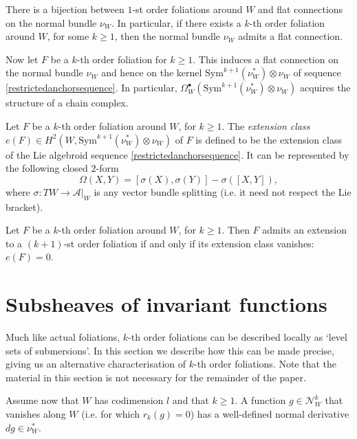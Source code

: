 \documentclass[10pt]{amsart}
\numberwithin{theoremalpha}{section}
\numberwithin{equation}{section}
\numberwithin{definition}{section}
\numberwithin{theorem}{section}
\numberwithin{proposition}{section}
\numberwithin{lemma}{section}
\numberwithin{example}{section}
\numberwithin{remark}{section}
\numberwithin{corollary}{section}
\numberwithin{question}{section}
\numberwithin{problem}{section}
\numberwithin{assumption}{section}
\theoremstyle{named}
\numberwithin{equation}{section}
\begin{document}
\begin{corollary} \label{existenceofflatconnection}
There is a bijection between $1$-st order foliations around $W$ and flat connections on the normal bundle $\nu_{W}$. In particular, if there exists a $k$-th order foliation around $W$, for some $k \geq 1$, then the normal bundle $\nu_{W}$ admits a flat connection. 
\end{corollary}

Now let $F$ be a $k$-th order foliation for $k \geq 1$. This induces a flat connection on the normal bundle $\nu_{W}$ and hence on the kernel $\mathrm{Sym}^{k+1}(\nu_{W}^*) \otimes \nu_{W}$ of sequence \eqref{restrictedanchorsequence}. In particular, $\Omega_{W}^{\bullet}(\mathrm{Sym}^{k+1}(\nu_{W}^*) \otimes \nu_{W})$ acquires the structure of a chain complex. 

\begin{definition}\label{def:extension}
Let $F$ be a $k$-th order foliation around $W$, for $k \geq 1$. The \emph{extension class} $e(F) \in H^{2}(W, \mathrm{Sym}^{k+1}(\nu_{W}^*) \otimes \nu_{W})$ of $F$ is defined to be the extension class of the Lie algebroid sequence \eqref{restrictedanchorsequence}. It can be represented by the following closed $2$-form 
\[
\Omega(X, Y) = [ \sigma(X), \sigma(Y)] - \sigma([X,Y]),
\]
where $\sigma : TW \to \mathcal{A}|_{W}$ is any vector bundle splitting (i.e. it need not respect the Lie bracket). 
\end{definition}

\begin{corollary}\label{cor:firstextensionclass}
Let $F$ be a $k$-th order foliation around $W$, for $k \geq 1$. Then $F$ admits an extension to a $(k+1)$-st order foliation if and only if its extension class vanishes: $e(F) = 0$. 
\end{corollary}

\section{Subsheaves of invariant functions}\label{sec:invfuns}
Much like actual foliations, $k$-th order foliations can be described locally as `level sets of submersions'. In this section we describe how this can be made precise, giving us an alternative characterisation of $k$-th order foliations. Note that the material in this section is not necessary for the remainder of the paper. 

 Assume now that $W$ has codimension $l$ and that $k \geq 1$. A function $g \in \mathcal{N}_{W}^{k}$ that vanishes along $W$ (i.e. for which $r_{k}(g) = 0$) has a well-defined normal derivative $dg \in \nu_{W}^{\ast}$. 
\end{document}
